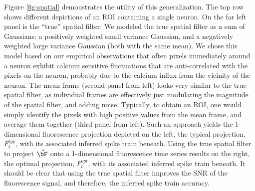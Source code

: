 Figure \ref{fig:spatial} demonstrates the utility of this generalization.  The top row shows different depictions of an ROI containing a single neuron.  On the far left panel is the ``true'' spatial filter.  We modeled the true spatial filter as a sum of Gaussians: a positively weighted small variance Gaussian, and a negatively weighted large variance Gaussian (both with the same mean).  We chose this model based on our empirical observations that often pixels immediately around a neuron exhibit calcium sensitive fluctuations that are anti-correlated with the pixels on the neuron, probably due to the calcium influx from the vicinity of the neuron. The mean frame (second panel from left) looks very similar to the true spatial filter, as individual frames are effectively just modulating the magnitude of the spatial filter, and adding noise.  Typically, to obtain an ROI, one would simply identify the pixels with high positive values from the mean frame, and average them together (third panel from left). Such an approach yields the 1-dimensional fluorescence projection depicted on the left, the typical projection, $F_t^{typ}$, with its associated inferred spike train beneath. Using the true spatial filter to project $\vec{\bF}$ onto a 1-dimensional fluorescence time series results on the right, the optimal projection, $F_t^{opt}$, with its associated inferred spike train beneath. It should be clear that using the true spatial filter improves the SNR of the fluorescence signal, and therefore, the inferred spike train accuracy.

